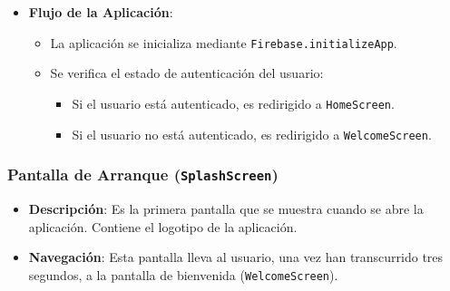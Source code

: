 \documentclass{article}
\begin{document}
\begin{flushleft}
\begin{itemize}
\begin{itemize}
        \item \textbf{Widget \texttt{AuthCheck}}:
        \begin{itemize}
            \item Escucha los cambios en el estado de autenticaci\'on del usuario a trav\'es de \texttt{FirebaseAuth}.
            \item Redirige al usuario a:
            \begin{itemize}
                \item \texttt{HomeScreen} si el usuario est\'a autenticado.
                \item \texttt{WelcomeScreen} si el usuario no est\'a autenticado.
            \end{itemize}
            \item Muestra un indicador de carga mientras se verifica el estado de autenticaci\'on.
        \end{itemize}
    \end{itemize}

    \item \textbf{Flujo de la Aplicaci\'on}:
    \begin{itemize}
        \item La aplicaci\'on se inicializa mediante \texttt{Firebase.initializeApp}.
        \item Se verifica el estado de autenticaci\'on del usuario:
        \begin{itemize}
            \item Si el usuario est\'a autenticado, es redirigido a \texttt{HomeScreen}.
            \item Si el usuario no est\'a autenticado, es redirigido a \texttt{WelcomeScreen}.
        \end{itemize}
    \end{itemize}
\end{itemize}


\clearpage

\subsubsection{Pantalla de Arranque (\texttt{SplashScreen})}
\begin{itemize}
    \item \textbf{Descripci\'on}: 
    Es la primera pantalla que se muestra cuando se abre la aplicaci\'on. Contiene el logotipo de la aplicaci\'on.

    \item \textbf{Navegaci\'on}: 
    Esta pantalla lleva al usuario, una vez han transcurrido tres segundos, a la pantalla de bienvenida (\texttt{WelcomeScreen}).
\end{itemize}


\end{flushleft}
\end{document}
